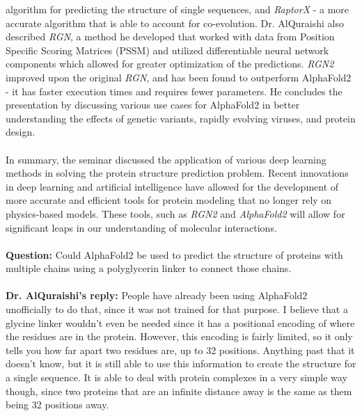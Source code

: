 \documentclass[hidelinks,11pt]{article}
\begin{document}
algorithm for predicting the structure of single sequences, and \emph{RaptorX} -  a more accurate
algorithm that is able to account for co-evolution. Dr. AlQuraishi also described \emph{RGN}, a method he developed
that worked with data from Position Specific Scoring Matrices (PSSM) and utilized differentiable neural network
components which allowed for greater optimization of the predictions. \emph{RGN2} improved upon
the original \emph{RGN}, and has been found to outperform AlphaFold2 - it has faster execution times
and requires fewer parameters. He concludes the presentation by discussing various use cases
for AlphaFold2 in better understanding the effects of genetic variants, rapidly evolving viruses,
and protein design.
\\\\
In summary, the seminar discussed the application of various deep learning methods in solving the protein
structure prediction problem. Recent innovations in deep learning and artificial intelligence
have allowed for the development of more accurate and efficient tools for protein modeling that no
longer rely on physics-based models. These tools, such as \emph{RGN2} and \emph{AlphaFold2}
will allow for significant leaps in our understanding of molecular interactions.
\\\\
\textbf{Question:} Could AlphaFold2 be used to predict the structure of proteins with multiple
chains using a polyglycerin linker to connect those chains.
\\\\
\textbf{Dr. AlQuraishi's reply:} People have already been using AlphaFold2 unofficially to do that,
since it was not trained for that purpose. I believe that a glycine linker
wouldn't even be needed since it has a positional encoding of where the residues are in the
protein. However, this encoding is fairly limited, so it only tells you how far apart two
residues are, up to 32 positions. Anything past that it doesn't know, but it is still able
to use this information to create the structure for a single sequence. It is able to deal
with protein complexes in a very simple way though, since two proteins that are an infinite
distance away is the same as them being 32 positions away.
\end{document}
